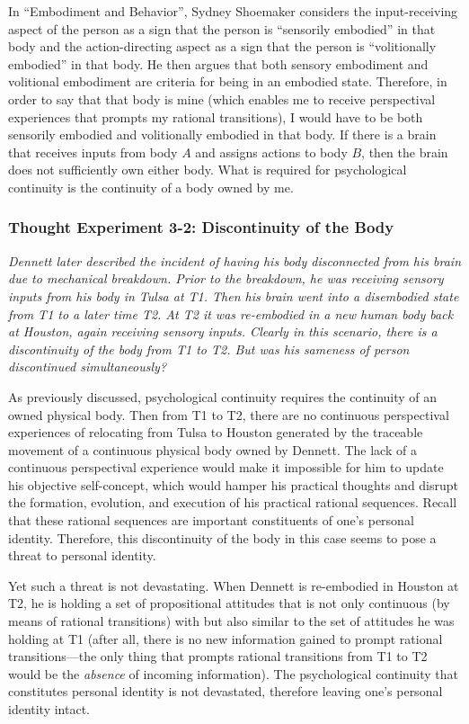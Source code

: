 In ``Embodiment and Behavior'', Sydney Shoemaker considers the
input-receiving aspect of the person as a sign that the person is
``sensorily embodied'' in that body and the action-directing aspect as a
sign that the person is ``volitionally embodied'' in that body. He then
argues that both sensory embodiment and volitional embodiment are
criteria for being in an embodied state. Therefore, in order to say that
that body is mine (which enables me to receive perspectival experiences
that prompts my rational transitions), I would have to be both sensorily
embodied and volitionally embodied in that body. If there is a brain
that receives inputs from body $A$ and assigns actions to body $B$, then the
brain does not sufficiently own either body. What is required for
psychological continuity is the continuity of a body owned by me.

\subsubsection*{Thought Experiment 3-2: Discontinuity of the Body}


\emph{Dennett later described the incident of having his body
disconnected from his brain due to mechanical breakdown. Prior to the
breakdown, he was receiving sensory inputs from his body in Tulsa at T1.
Then his brain went into a disembodied state from T1 to a later time T2.
At T2 it was re-embodied in a new human body back at Houston, again
receiving sensory inputs. Clearly in this scenario, there is a
discontinuity of the body from T1 to T2. But was his sameness of person
discontinued simultaneously? }
\vspace{1em}

As previously discussed, psychological continuity requires the
continuity of an owned physical body. Then from T1 to T2, there are no
continuous perspectival experiences of relocating from Tulsa to Houston
generated by the traceable movement of a continuous physical body owned
by Dennett. The lack of a continuous perspectival experience would make
it impossible for him to update his objective self-concept, which would
hamper his practical thoughts and disrupt the formation, evolution, and
execution of his practical rational sequences. Recall that these
rational sequences are important constituents of one's personal
identity. Therefore, this discontinuity of the body in this case seems
to pose a threat to personal identity.

Yet such a threat is not devastating. When Dennett is re-embodied in
Houston at T2, he is holding a set of propositional attitudes that is
not only continuous (by means of rational transitions) with but also
similar to the set of attitudes he was holding at T1 (after all, there
is no new information gained to prompt rational transitions---the only
thing that prompts rational transitions from T1 to T2 would be the
\emph{absence} of incoming information). The psychological continuity
that constitutes personal identity is not devastated, therefore leaving
one's personal identity intact.

